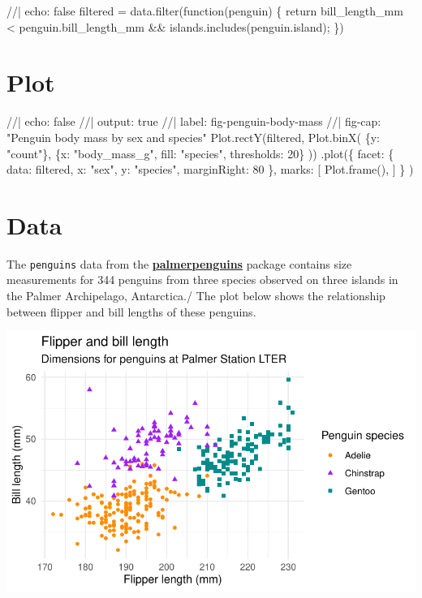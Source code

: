 \documentclass[
  a4paper,
]{scrbook}
\newenvironment{Shaded}{}{}
\newcommand{\NormalTok}[1]{\textcolor[rgb]{0.14,0.16,0.18}{#1}}
\begin{document}
\begin{Shaded}
\begin{Highlighting}[numbers=left,,]
\NormalTok{//| echo: false}
\NormalTok{filtered = data.filter(function(penguin) \{}
\NormalTok{  return bill\_length\_mm \textless{} penguin.bill\_length\_mm \&\&}
\NormalTok{         islands.includes(penguin.island);}
\NormalTok{\})}
\end{Highlighting}
\end{Shaded}

\hypertarget{plot}{%
\section{Plot}\label{plot}}

\begin{Shaded}
\begin{Highlighting}[numbers=left,,]
\NormalTok{//| echo: false}
\NormalTok{//| output: true}
\NormalTok{//| label: fig{-}penguin{-}body{-}mass}
\NormalTok{//| fig{-}cap: "Penguin body mass by sex and species"}
\NormalTok{Plot.rectY(filtered, }
\NormalTok{  Plot.binX(}
\NormalTok{    \{y: "count"\}, }
\NormalTok{    \{x: "body\_mass\_g", fill: "species", thresholds: 20\}}
\NormalTok{  ))}
\NormalTok{  .plot(\{}
\NormalTok{    facet: \{}
\NormalTok{      data: filtered,}
\NormalTok{      x: "sex",}
\NormalTok{      y: "species",}
\NormalTok{      marginRight: 80}
\NormalTok{    \},}
\NormalTok{    marks: [}
\NormalTok{      Plot.frame(),}
\NormalTok{    ]}
\NormalTok{  \}}
\NormalTok{)}
\end{Highlighting}
\end{Shaded}

\hypertarget{data}{%
\section{Data}\label{data}}

The \texttt{penguins} data from the
\href{https://allisonhorst.github.io/palmerpenguins}{\textbf{palmerpenguins}}
package contains size measurements for 344 penguins from three species
observed on three islands in the Palmer Archipelago, Antarctica./ The
plot below shows the relationship between flipper and bill lengths of
these penguins.

\includegraphics{./part1_files/figure-pdf/plot-penguins-1.pdf}
\end{document}
